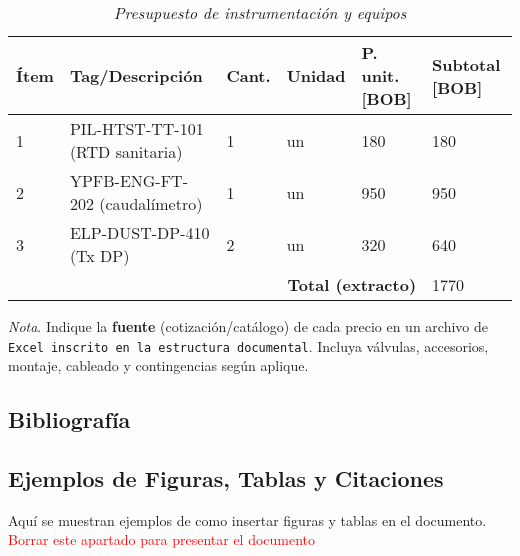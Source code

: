 \documentclass[12pt,letterpaper]{report}
\begin{document}
	\begin{table}[ht]
		\captionsetup{justification=raggedright,singlelinecheck=false}
		\caption{\textit{Presupuesto de instrumentación y equipos}}
		\label{tab:presupuesto}
		\centering
		\begin{tabular}{llllll}
			\toprule
			\textbf{Ítem} & \textbf{Tag/Descripción} & \textbf{Cant.} & \textbf{Unidad} & \textbf{P. unit. [BOB]} & \textbf{Subtotal [BOB]} \\
			\midrule
			1 & PIL-HTST-TT-101 (RTD sanitaria) & 1 & un & \num{180} & \num{180} \\
			2 & YPFB-ENG-FT-202 (caudalímetro) & 1 & un & \num{950} & \num{950} \\
			3 & ELP-DUST-DP-410 (Tx DP) & 2 & un & \num{320} & \num{640} \\
			\midrule
			\multicolumn{5}{r}{\textbf{Total (extracto)}} & \num{1770} \\
			\bottomrule
		\end{tabular}
		\begin{flushleft}
			\textit{Nota}. Indique la \textbf{fuente} (cotización/catálogo) de cada precio en un archivo de \texttt{Excel inscrito en la estructura documental}. Incluya válvulas, accesorios, montaje, cableado y contingencias según aplique.
		\end{flushleft}
	\end{table}
	
	
	\newpage
	\begin{center}
		\section*{Bibliografía}
	\end{center}
	
	
	
	
	\newpage
	\begin{center}
		\section*{Ejemplos de Figuras, Tablas y Citaciones}
	\end{center}
	Aquí se muestran ejemplos de como insertar figuras y tablas en el documento. \\
	\textcolor{red}{Borrar este apartado para presentar el documento}
	
\end{document}
